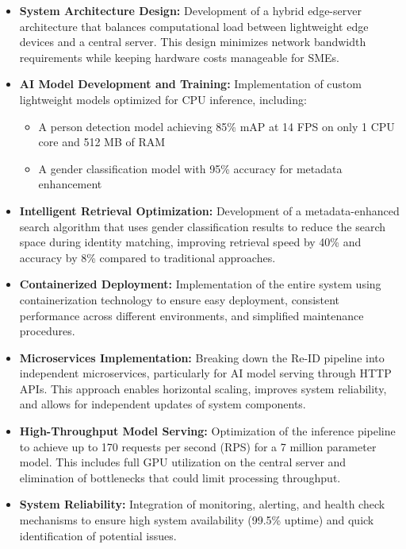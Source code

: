 \documentclass[../main.tex]{subfiles}
\begin{document}
\begin{itemize}
    \item \textbf{System Architecture Design:} Development of a hybrid edge-server architecture that balances computational load between lightweight edge devices and a central server. This design minimizes network bandwidth requirements while keeping hardware costs manageable for SMEs.
    
    \item \textbf{AI Model Development and Training:} Implementation of custom lightweight models optimized for CPU inference, including:
    \begin{itemize}
        \item A person detection model achieving 85\% mAP at 14 FPS on only 1 CPU core and 512 MB of RAM
        \item A gender classification model with 95\% accuracy for metadata enhancement
    \end{itemize}
    
    \item \textbf{Intelligent Retrieval Optimization:} Development of a metadata-enhanced search algorithm that uses gender classification results to reduce the search space during identity matching, improving retrieval speed by 40\% and accuracy by 8\% compared to traditional approaches.
    
    \item \textbf{Containerized Deployment:} Implementation of the entire system using \\ containerization technology to ensure easy deployment, consistent performance across different environments, and simplified maintenance procedures.
    
    \item \textbf{Microservices Implementation:} Breaking down the Re-ID pipeline into \\ independent microservices, particularly for AI model serving through HTTP APIs. This approach enables horizontal scaling, improves system reliability, and allows for independent updates of system components.

    \item \textbf{High-Throughput Model Serving:} Optimization of the inference pipeline to achieve up to 170 requests per second (RPS) for a 7 million parameter model. This includes full GPU utilization on the central server and elimination of bottlenecks that could limit processing throughput.
    
    \item \textbf{System Reliability:} Integration of monitoring, alerting, and health check mechanisms to ensure high system availability (99.5\% uptime) and quick identification of potential issues.
\end{itemize}
\end{document}
